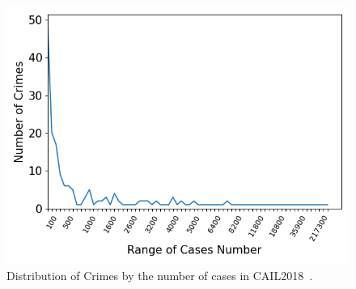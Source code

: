   
\begin{figure}[!t]
    \centering
    \includegraphics[width=0.9\columnwidth]{figs/sta1.png}
    \caption{Distribution of Crimes by the number of cases in CAIL2018~\cite{DBLP:journals/corr/abs-1807-02478}. 
    }
    \label{fig:sta}
    \vspace{-1em}
\end{figure}

    
